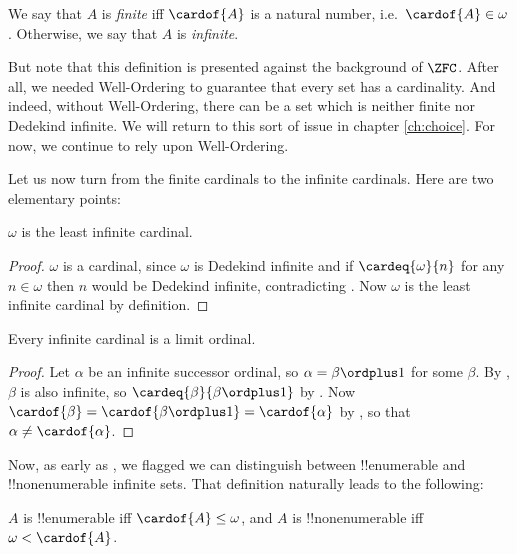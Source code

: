 \documentclass[../../../include/open-logic-section]{subfiles}
\begin{document}
\begin{defn}
	We say that $A$ is \emph{finite} iff $\cardof{A}$ is a natural number, i.e.\ $\cardof{A} \in \omega$. Otherwise, we say that $A$ is \emph{infinite}.
\end{defn}\noindent
But note that this definition is presented against the background of $\ZFC$. After all, we needed Well-Ordering to guarantee that every set has a cardinality. And indeed, without Well-Ordering, there can be a set which is neither finite nor Dedekind infinite. We will return to this sort of issue in chapter \ref{ch:choice}. For now, we continue to rely upon Well-Ordering.

Let us now turn from the finite cardinals to the infinite cardinals. Here are two elementary points:
\begin{cor}
	$\omega$ is the least infinite cardinal. 
\end{cor}
\begin{proof}
	$\omega$ is a cardinal, since $\omega$ is Dedekind infinite and if $\cardeq{\omega}{n}$ for any $n \in \omega$ then $n$ would be Dedekind infinite, contradicting . Now $\omega$ is the least infinite cardinal by definition. 
\end{proof}
\begin{cor}
	Every infinite cardinal is a limit ordinal.
\end{cor}
\begin{proof}
	Let $\alpha$ be an infinite successor ordinal, so $\alpha = \beta \ordplus 1$ for some $\beta$. By , $\beta$ is also infinite, so $\cardeq{\beta}{\beta \ordplus 1}$ by  . Now $\cardof{\beta} = \cardof{\beta\ordplus 1} = \cardof{\alpha}$ by , so that $\alpha \neq \cardof{\alpha}$. 
\end{proof}\noindent
Now, as early as , we flagged we can distinguish between !!{enumerable} and !!{nonenumerable} infinite sets. That definition naturally leads to the following:
\begin{prop}
	$A$ is {!!{enumerable}} iff $\cardof{A} \leq \omega$, and $A$ is !!{nonenumerable} iff $\omega < \cardof{A}$.
\end{prop}
\end{document}
